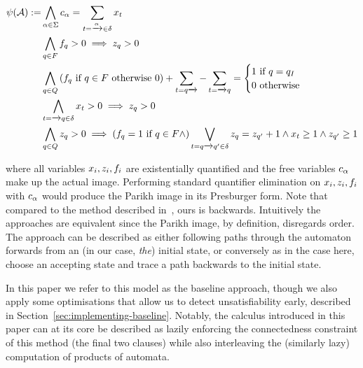 \documentclass[acmsmall,review,anonymous,screen]{acmart}\settopmatter{printfolios=true,printccs=false,printacmref=true}
\theoremstyle{definition}
\begin{document}
\begin{equation}
\begin{aligned}
\ParikhMap(\Automaton) := 
& \AndComp{\Letter \in \Alphabet}{\LetterVar_{\Letter} = \sum_{\Transition = \FromLabelTo{}{\Letter}{} \in \Transitions} \TransitionVar_{\Transition}
}\\
& \AndComp{\State \in \AcceptingStates}{\FinalStateVar_{\State} > 0 \implies \StateVar_{\State} > 0}\\
& \AndComp{\State \in \States}{
  \left(\FinalStateVar_{\State} \text{ if } \State \in \AcceptingStates \text{ otherwise } 0 \right) +
  \sum_{\Transition = \FromLabelTo{\State}{}{}} - \sum_{\Transition = \FromLabelTo{}{}{\State}}
= \begin{cases}
    1 \text{  if $\State = \InitialState$} \\
    0 \text{ otherwise}
  \end{cases}
}\\
& \AndComp{\Transition = \FromLabelTo{}{}{\State} \in \Transitions}{
  \TransitionVar_{\Transition} > 0 \implies \StateVar_{\State} > 0
} \\
& \AndComp{\State \in \States}{
  \StateVar_{\State} > 0 \implies
  \left(\FinalStateVar_{\State} = 1 \text{ if } \State \in \AcceptingStates \land \right) \OrComp{\Transition = \FromLabelTo{\State}{}{\State'} \in \Transitions}{
    \StateVar_{\State} = \StateVar_{\State'} + 1 \land 
    \TransitionVar_{\Transition} \geq 1 \land
  \StateVar_{\State'} \geq 1
    }
}
\end{aligned}
\label{eq:generate-parikh}
\end{equation}

where all variables $x_i, z_i, f_i$ are
existentially quantified and the free variables $c_\alpha$ make up the
actual image. Performing standard quantifier elimination on $x_i,
z_i, f_i$ with $c_\alpha$ would produce the
Parikh image in its Presburger form. Note that compared to the method described
in~\cite{generate-parikh-image}, ours is backwards. Intuitively the approaches
are equivalent since the Parikh image, by definition, disregards order. The
approach can be described as either following paths through the automaton
forwards from an (in our case, \emph{the}) initial state, or conversely as in
the case here, choose an accepting state and trace a path backwards to the
initial state. 

In this paper we refer to this model as the baseline approach, though we also
apply some optimisations that allow us to detect unsatisfiability early,
described in Section~\ref{sec:implementing-baseline}. Notably, the calculus
introduced in this paper can at its core be described as lazily enforcing the
connectedness constraint of this method (the final two clauses) while also
interleaving the (similarly lazy) computation of products of automata.
\end{document}
